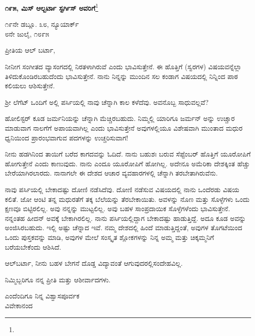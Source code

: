 \begin{center}
\textbf{೧೯೫, ಮಿಸ್ ಆಲ್ಬರ್ಟಾ ಸ್ಟರ್ಗಿಸ್ ಅವರಿಗೆ}\footnote{}
\end{center}
\vspace{-0.5cm}

\begin{flushright}
೧೯ನೇ ಡಬ್ಲೂ. ೩೮, ನ್ಯೂಯಾರ್ಕ್\\೮ನೇ ಜುಲೈ, ೧೮೯೫
\end{flushright}
\vspace{-0.3cm}

\noindent
ಪ್ರೀತಿಯ ಆಲ್ ಬರ್ಟಾ,

ನೀನೀಗ ಸಂಗೀತದ ವ್ಯಾಸಂಗದಲ್ಲಿ ನಿರತಳಾಗಿರುವೆ ಎಂದು ಭಾವಿಸುತ್ತೇನೆ. ಈ ಹೊತ್ತಿಗೆ  (ಸ್ವರಗಳ) ವಿಷಯವನ್ನೆಲ್ಲಾ ತಿಳಿದುಕೊಂಡಿರಬಹುದೆಂದು ಭಾವಿಸುತ್ತೇನೆ. ನಾನು ನಿನ್ನನ್ನು ಮುಂದಿನ ಸಲ ಕಂಡಾಗ  ವಿಷಯದಲ್ಲಿ ನಿನ್ನಿಂದ ಪಾಠ ಕಲಿಯಲು ಆಶಿಸುತ್ತೇನೆ.

ಶ‍್ರೀ ಲೆಗೆಟ್ ಒಂದಿಗೆ ಅಲ್ಲಿ ಪರ್ಸಿಯಲ್ಲಿ ನಾವು ಚೆನ್ನಾಗಿ ಕಾಲ ಕಳೆದೆವು. ಅವನೊಬ್ಬ ಸಾಧುವಲ್ಲವೆ?

ಹೋಲಿಸ್ಟರ್ ಕೂಡ ಜರ್ಮನಿಯನ್ನು ಚೆನ್ನಾಗಿ ಮೆಚ್ಚಿರಬಹುದು. ನಿಮ್ಮಲ್ಲಿ ಯಾರಿಗೂ ಜರ್ಮನ್‌ ಅನ್ನು ಉಚ್ಚಾರ ಮಾಡುವಾಗ ನಾಲಗೆಗೆ ಅಪಾಯವಾಗಿಲ್ಲ ಎಂದು ಭಾವಿಸುತ್ತೇನೆ\enginline{-} ಅವುಗಳಲ್ಲಿಯೂ ವಿಶೇಷವಾಗಿ  ಮುಂತಾದ ಮಧುರ ಧ್ವನಿಯಿಂದ ಪ್ರಾರಂಭವಾಗುವ ಪದಗಳನ್ನು ಉಚ್ಚರಿಸುವಾಗ!

ನೀನು ಹಡಗಿನಿಂದ ತಾಯಿಗೆ ಬರೆದ ಕಾಗದವನ್ನು ಓದಿದೆ. ನಾನು ಬಹುಶಃ ಬರುವ ಸೆಪ್ಟೆಂಬರ್‌ ಹೊತ್ತಿಗೆ ಯೂರೋಪಿಗೆ ಹೋಗುತ್ತೇನೆ ಎಂದು ಕಾಣುವುದು. ನಾನು ಎಂದೂ ಯೂರೋಪಿಗೆ ಹೋಗಿಲ್ಲ. ಅದೇನೂ ಅಮೆರಿಕಾ ದೇಶಕ್ಕಿಂತ ಹೆಚ್ಚು ಬೇರೆಯಾಗಿರಲಾರದು. ನಾನಾಗಲೇ ಈ ದೇಶದ ಆಚಾರ ವ್ಯವಹಾರಗಳಲ್ಲಿ ಚೆನ್ನಾಗಿ ತರಬೇತಾಗಿರುವೆನು.

ನಾವು ಪರ್ಸಿಯಲ್ಲಿ ಬೇಕಾದಷ್ಟು ದೋಣಿ ನಡೆಸಿದೆವು. ದೋಣಿ ನಡೆಸುವ ವಿಷಯದಲ್ಲಿ ನಾನು ಒಂದೆರಡು ವಿಷಯ ಕಲಿತೆ. ಜೋ ಆಂಟಿ ತನ್ನ ಮಧುರತೆಗೆ ತಕ್ಕ ಬೆಲೆಯನ್ನು ತೆರಬೇಕಾಯಿತು. ಅವಳನ್ನು ನೊಣ ಮತ್ತು ಸೊಳ್ಳೆಗಳು ಒಂದು ಕ್ಷಣವೂ ಬಿಟ್ಟಿರಲಿಲ್ಲ. ಅವು ನನ್ನನ್ನು ಮುಟ್ಟಲಿಲ್ಲ. ಅವು ಬಹಳ ಸಾಂಪ್ರದಾಯಿಕ ಸೊಳ್ಳೆಗಳೆಂದು ಭಾವಿಸುತ್ತೇನೆ. ನನ್ನಂತಹ ಹೀದನ್ ಅವಕ್ಕೆ ಬೇಕಾಗಿರಲಿಲ್ಲ. ನಾನು ಪರ್ಸಿಯಲ್ಲಿದ್ದಾಗ ಬೇಕಾದಷ್ಟು ಹಾಡುತ್ತಿದ್ದೆ. ಅದೂ ಕೂಡ ಅವನ್ನು ಅಂಜಿಸಿರಬಹುದು. ಇಲ್ಲಿ ಅಷ್ಟು ಚೆನ್ನಾದ  ಇವೆ. ನಮ್ಮ ದೇಶದಲ್ಲಿ ಹಿಂದೆ ಮಾಡುತ್ತಿದ್ದಂತೆ, ಅವುಗಳ ತೊಗಟೆಯಿಂದ ಒಂದು ಪುಸ್ತಕವನ್ನು ಮಾಡಿ, ಅವುಗಳ ಮೇಲೆ ಸಂಸ್ಕೃತ ಶ್ಲೋಕಗಳನ್ನು ನಿನ್ನ ಅಮ್ಮ ಮತ್ತು ಚಿಕ್ಕಮ್ಮನಿಗೆ ಬರೆಯಬೇಕೆಂದು ಆಶಿಸಿದೆ.

ಆಲ್‌ಬರ್ಟಾ, ನೀನು ಬಹಳ ಬೇಗನೆ ದೊಡ್ಡ ವಿದ್ಯಾವಂತೆ ಆಗುವುದರಲ್ಲಿ\break ಸಂದೇಹವಿಲ್ಲ.

ನಿಮ್ಮಿಬ್ಬರಿಗೂ ನನ್ನ ಪ್ರೀತಿ ಮತ್ತು ಆಶೀರ್ವಾದಗಳು.

{\flushright
ಎಂದೆಂದಿಗೂ ನಿನ್ನ ವಿಶ್ವಾಸಪೂರ್ವಕ\\ವಿವೇಕಾನಂದ\par}

